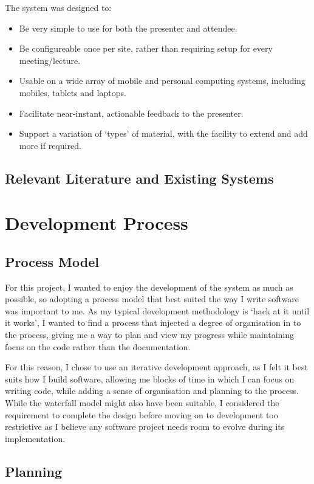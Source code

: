\documentclass[a4papert,11pt,notitlepage]{ltxdoc}
\begin{document}
The system was designed to:
\begin{itemize}
\item Be very simple to use for both the presenter and attendee.
\item Be configureable once per site, rather than requiring setup for every meeting/lecture.
\item Usable on a wide array of mobile and personal computing systems, including mobiles, tablets and laptops.
\item Facilitate near-instant, actionable feedback to the presenter.
\item Support a variation of `types' of material, with the facility to extend and add more if required.
\end{itemize}

\subsection{Relevant Literature and Existing Systems}

\section{Development Process}
\subsection{Process Model}
For this project, I wanted to enjoy the development of the system as much as possible, so adopting a process model that best suited the way I write software was important to me. As my typical development methodology is `hack at it until it works', I wanted to find a process that injected a degree of organisation in to the process, giving me a way to plan and view my progress while maintaining focus on the code rather than the documentation.

For this reason, I chose to use an iterative development approach, as I felt it best suits how I build software, allowing me blocks of time in which I can focus on writing code, while adding a sense of organisation and planning to the process. While the waterfall model might also have been suitable, I considered the requirement to complete the design before moving on to development too restrictive as I believe any software project needs room to evolve during its implementation.

\subsection{Planning}
\end{document}
